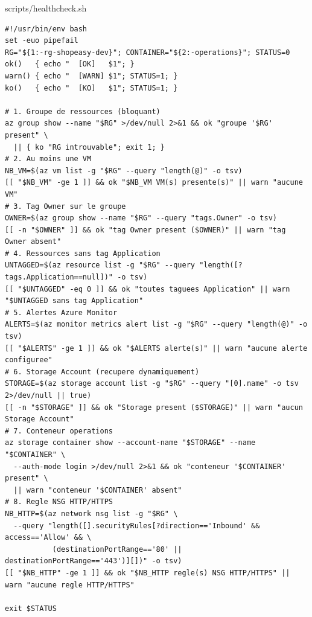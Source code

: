 \documentclass[11pt,a4paper]{article}
\begin{document}
\begin{codebox}{scripts/healthcheck.sh}
\begin{Verbatim}
#!/usr/bin/env bash
set -euo pipefail
RG="${1:-rg-shopeasy-dev}"; CONTAINER="${2:-operations}"; STATUS=0
ok()   { echo "  [OK]   $1"; }
warn() { echo "  [WARN] $1"; STATUS=1; }
ko()   { echo "  [KO]   $1"; STATUS=1; }

# 1. Groupe de ressources (bloquant)
az group show --name "$RG" >/dev/null 2>&1 && ok "groupe '$RG' present" \
  || { ko "RG introuvable"; exit 1; }
# 2. Au moins une VM
NB_VM=$(az vm list -g "$RG" --query "length(@)" -o tsv)
[[ "$NB_VM" -ge 1 ]] && ok "$NB_VM VM(s) presente(s)" || warn "aucune VM"
# 3. Tag Owner sur le groupe
OWNER=$(az group show --name "$RG" --query "tags.Owner" -o tsv)
[[ -n "$OWNER" ]] && ok "tag Owner present ($OWNER)" || warn "tag Owner absent"
# 4. Ressources sans tag Application
UNTAGGED=$(az resource list -g "$RG" --query "length([?tags.Application==null])" -o tsv)
[[ "$UNTAGGED" -eq 0 ]] && ok "toutes taguees Application" || warn "$UNTAGGED sans tag Application"
# 5. Alertes Azure Monitor
ALERTS=$(az monitor metrics alert list -g "$RG" --query "length(@)" -o tsv)
[[ "$ALERTS" -ge 1 ]] && ok "$ALERTS alerte(s)" || warn "aucune alerte configuree"
# 6. Storage Account (recupere dynamiquement)
STORAGE=$(az storage account list -g "$RG" --query "[0].name" -o tsv 2>/dev/null || true)
[[ -n "$STORAGE" ]] && ok "Storage present ($STORAGE)" || warn "aucun Storage Account"
# 7. Conteneur operations
az storage container show --account-name "$STORAGE" --name "$CONTAINER" \
  --auth-mode login >/dev/null 2>&1 && ok "conteneur '$CONTAINER' present" \
  || warn "conteneur '$CONTAINER' absent"
# 8. Regle NSG HTTP/HTTPS
NB_HTTP=$(az network nsg list -g "$RG" \
  --query "length([].securityRules[?direction=='Inbound' && access=='Allow' && \
           (destinationPortRange=='80' || destinationPortRange=='443')][])" -o tsv)
[[ "$NB_HTTP" -ge 1 ]] && ok "$NB_HTTP regle(s) NSG HTTP/HTTPS" || warn "aucune regle HTTP/HTTPS"

exit $STATUS
\end{Verbatim}
\end{codebox}
\end{document}
